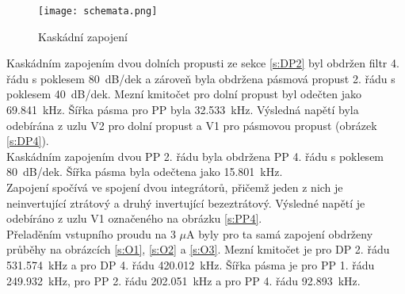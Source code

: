 \begin{figure}[h]
\centering
\texttt{[image: schemata.png]}
\caption[Kaskádní zapojení]{Kaskádní zapojení \cite{12}}
\end{figure}
Kaskádním zapojením dvou dolních propusti ze sekce \ref{s:DP2} byl obdržen filtr 4. řádu s poklesem 80~dB/dek a zároveň byla obdržena pásmová propust 2. řádu s poklesem 40~dB/dek. Mezní kmitočet pro dolní propust byl odečten jako 69.841~kHz. Šířka pásma pro PP byla 32.533~kHz. Výsledná napětí byla odebírána z uzlu V2 pro dolní propust a V1 pro pásmovou propust (obrázek \ref{s:DP4}). \\
\noindent Kaskádním zapojením dvou PP 2. řádu byla obdržena PP 4. řádu s poklesem 80~dB/dek. Šířka pásma byla odečtena jako 15.801~kHz.\\ Zapojení spočívá ve spojení dvou integrátorů, přičemž jeden z nich je neinvertující ztrátový a druhý invertující bezeztrátový. Výsledné napětí je odebíráno z uzlu V1 označeného na obrázku \ref{s:PP4}.\\
\noindent Přeladěním vstupního proudu na 3 $\mu$A byly pro ta samá zapojení obdrženy průběhy na obrázcích \ref{s:O1}, \ref{s:O2} a  \ref{s:O3}. Mezní kmitočet je pro DP 2. řádu 531.574~kHz a pro DP 4. řádu 420.012~kHz. Šířka pásma je pro PP 1. řádu 249.932~kHz, pro PP 2. řádu 202.051~kHz a pro PP 4. řádu 92.893~kHz.